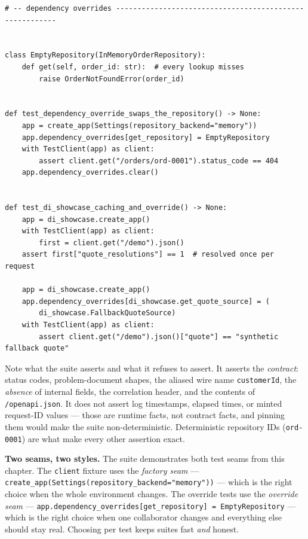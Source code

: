 \begin{verbatim}
# -- dependency overrides --------------------------------------------------------


class EmptyRepository(InMemoryOrderRepository):
    def get(self, order_id: str):  # every lookup misses
        raise OrderNotFoundError(order_id)


def test_dependency_override_swaps_the_repository() -> None:
    app = create_app(Settings(repository_backend="memory"))
    app.dependency_overrides[get_repository] = EmptyRepository
    with TestClient(app) as client:
        assert client.get("/orders/ord-0001").status_code == 404
    app.dependency_overrides.clear()


def test_di_showcase_caching_and_override() -> None:
    app = di_showcase.create_app()
    with TestClient(app) as client:
        first = client.get("/demo").json()
    assert first["quote_resolutions"] == 1  # resolved once per request

    app = di_showcase.create_app()
    app.dependency_overrides[di_showcase.get_quote_source] = (
        di_showcase.FallbackQuoteSource)
    with TestClient(app) as client:
        assert client.get("/demo").json()["quote"] == "synthetic fallback quote"
\end{verbatim}


Note what the suite asserts and what it refuses to assert. It asserts the
\emph{contract}: status codes, problem-document shapes, the aliased wire name
\texttt{customerId}, the \emph{absence} of internal fields, the correlation
header, and the contents of \texttt{/openapi.json}. It does not assert log
timestamps, elapsed times, or minted request-ID values --- those are runtime
facts, not contract facts, and pinning them would make the suite
non-deterministic. Deterministic repository IDs (\texttt{ord-0001}) are what
make every other assertion exact.

\begin{examplebox}
\textbf{Two seams, two styles.} The suite demonstrates both test seams from
this chapter. The \texttt{client} fixture uses the \emph{factory seam} ---
\texttt{create\_app(Settings(repository\_backend="memory"))} --- which is the
right choice when the whole environment changes. The override tests use the
\emph{override seam} --- \texttt{app.dependency\_overrides[get\_repository] =
EmptyRepository} --- which is the right choice when one collaborator changes
and everything else should stay real. Choosing per test keeps suites fast
\emph{and} honest.
\end{examplebox}

